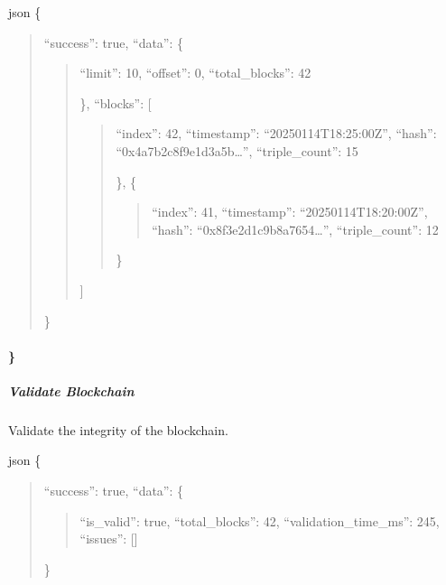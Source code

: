 \documentclass[letterpaper,10pt,english]{sphinxmanual}
\begin{document}
\sphinxAtStartPar
{}
{\color{red}\bfseries{}\textasciigrave{}\textasciigrave{}}{\color{red}\bfseries{}\textasciigrave{}}json
\{
\begin{quote}

\sphinxAtStartPar
“success”: true,
“data”: \{
\begin{quote}
\begin{description}
\sphinxAtStartPar
“limit”: 10,
“offset”: 0,
“total\_blocks”: 42

\end{description}

\sphinxAtStartPar
\},
“blocks”: {[}
\begin{quote}
\begin{description}
\sphinxlineitem{\{}
\sphinxAtStartPar
“index”: 42,
“timestamp”: “2025\sphinxhyphen{}01\sphinxhyphen{}14T18:25:00Z”,
“hash”: “0x4a7b2c8f9e1d3a5b…”,
“triple\_count”: 15

\end{description}

\sphinxAtStartPar
\},
\{
\begin{quote}

\sphinxAtStartPar
“index”: 41,
“timestamp”: “2025\sphinxhyphen{}01\sphinxhyphen{}14T18:20:00Z”,
“hash”: “0x8f3e2d1c9b8a7654…”,
“triple\_count”: 12
\end{quote}

\sphinxAtStartPar
\}
\end{quote}

\sphinxAtStartPar
{]}
\end{quote}

\sphinxAtStartPar
\}
\end{quote}


\paragraph{\}}
\label{\detokenize{api/rest-api:id48}}

\subparagraph{Validate Blockchain}
\label{\detokenize{api/rest-api:validate-blockchain}}
\sphinxAtStartPar
Validate the integrity of the blockchain.

\sphinxAtStartPar
{} 

\sphinxAtStartPar
{}
{\color{red}\bfseries{}\textasciigrave{}\textasciigrave{}}{\color{red}\bfseries{}\textasciigrave{}}json
\{
\begin{quote}

\sphinxAtStartPar
“success”: true,
“data”: \{
\begin{quote}

\sphinxAtStartPar
“is\_valid”: true,
“total\_blocks”: 42,
“validation\_time\_ms”: 245,
“issues”: {[}{]}
\end{quote}

\sphinxAtStartPar
\}
\end{quote}
\end{document}
